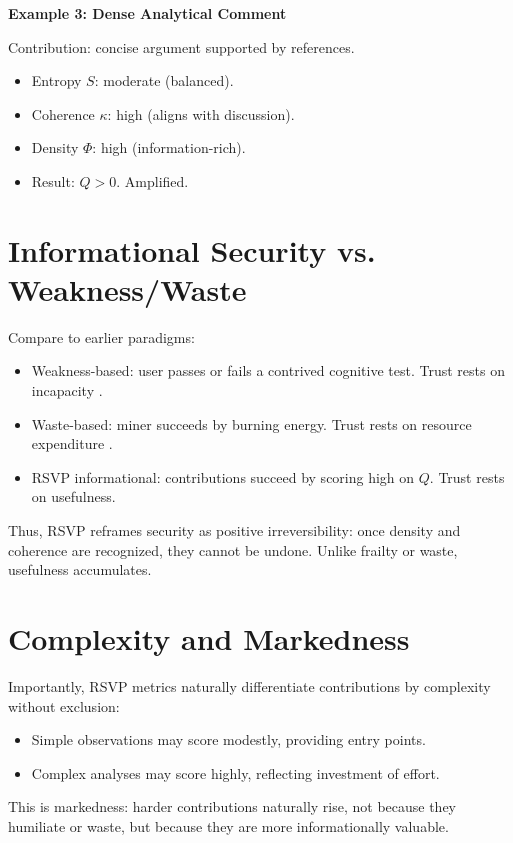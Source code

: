 \documentclass[openany]{book}
\begin{document}
\textbf{Example 3: Dense Analytical Comment}

Contribution: concise argument supported by references.

\begin{itemize}
    \item Entropy $S$: moderate (balanced).
    \item Coherence $\kappa$: high (aligns with discussion).
    \item Density $\Phi$: high (information-rich).
    \item Result: $Q > 0$. Amplified.
\end{itemize}

\section{Informational Security vs. Weakness/Waste}

Compare to earlier paradigms:

\begin{itemize}
    \item Weakness-based: user passes or fails a contrived cognitive test. Trust rests on incapacity \cite{conitzer2020}.
    \item Waste-based: miner succeeds by burning energy. Trust rests on resource expenditure \cite{nakamoto2008}.
    \item RSVP informational: contributions succeed by scoring high on $Q$. Trust rests on usefulness.
\end{itemize}

Thus, RSVP reframes security as positive irreversibility: once density and coherence are recognized, they cannot be undone. Unlike frailty or waste, usefulness accumulates.

\section{Complexity and Markedness}

Importantly, RSVP metrics naturally differentiate contributions by complexity without exclusion:

\begin{itemize}
    \item Simple observations may score modestly, providing entry points.
    \item Complex analyses may score highly, reflecting investment of effort.
\end{itemize}

This is markedness: harder contributions naturally rise, not because they humiliate or waste, but because they are more informationally valuable.
\end{document}
